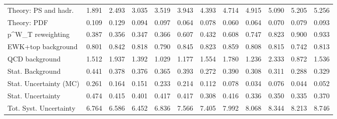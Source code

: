 \begin{tabular}{l|p{0.6cm}p{0.6cm}p{0.6cm}p{0.6cm}p{0.6cm}p{0.6cm}p{0.6cm}p{0.6cm}p{0.6cm}p{0.6cm}p{0.6cm}}
Theory: PS and hadr.                     & 1.891 & 2.493 & 3.035 & 3.519 & 3.943 & 4.393 & 4.714 & 4.915 & 5.090 & 5.205 & 5.256 \\
Theory: PDF                              & 0.109 & 0.129 & 0.094 & 0.097 & 0.064 & 0.078 & 0.060 & 0.064 & 0.070 & 0.079 & 0.093 \\
p^{W}_{T} reweighting                    & 0.387 & 0.356 & 0.347 & 0.366 & 0.607 & 0.432 & 0.608 & 0.747 & 0.823 & 0.900 & 0.933 \\
EWK+top background                       & 0.801 & 0.842 & 0.818 & 0.790 & 0.845 & 0.823 & 0.859 & 0.808 & 0.815 & 0.742 & 0.813 \\
QCD background                           & 1.512 & 1.937 & 1.392 & 1.029 & 1.177 & 1.554 & 1.780 & 1.236 & 2.333 & 0.872 & 1.536 \\
Stat. Background                         & 0.441 & 0.378 & 0.376 & 0.365 & 0.393 & 0.272 & 0.390 & 0.308 & 0.311 & 0.288 & 0.329 \\
Stat. Uncertainty (MC)                   & 0.261 & 0.164 & 0.151 & 0.233 & 0.214 & 0.112 & 0.078 & 0.034 & 0.076 & 0.044 & 0.052 \\
\hline
Stat. Uncertainty                        & 0.474 & 0.415 & 0.401 & 0.417 & 0.417 & 0.308 & 0.416 & 0.336 & 0.350 & 0.335 & 0.370 \\
\hline
Tot. Syst. Uncertainty                   & 6.764 & 6.586 & 6.452 & 6.836 & 7.566 & 7.405 & 7.992 & 8.068 & 8.344 & 8.213 & 8.746 \\
\hline
\end{tabular}

